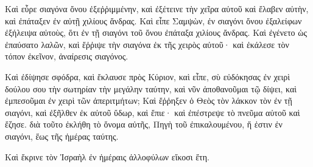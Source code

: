{Καὶ εὗρε σιαγόνα ὄνου ἐξεῤῥιμμένην, καὶ ἐξέτεινε τὴν χεῖρα αὐτοῦ καὶ ἔλαβεν αὐτὴν, καὶ ἐπάταξεν ἐν αὐτῇ χιλίους ἄνδρας.
Καὶ εἶπε Σαμψὼν, ἐν σιαγόνι ὄνου ἐξαλείφων ἐξήλειψα αὐτοὺς, ὅτι ἐν τῇ σιαγόνι τοῦ ὄνου ἐπάταξα χιλίους ἄνδρας.
Καὶ ἐγένετο ὡς ἐπαύσατο λαλῶν, καὶ ἔῤῥιψε τὴν σιαγόνα ἐκ τῆς χειρὸς αὐτοῦ· καὶ ἐκάλεσε τὸν τόπον ἐκεῖνον, ἀναίρεσις σιαγόνος.
\par }{\PP {}Καὶ ἐδίψησε σφόδρα, καὶ ἔκλαυσε πρὸς Κύριον, καὶ εἶπε, σὺ εὐδόκησας ἐν χειρὶ δούλου σου τὴν σωτηρίαν τὴν μεγάλην ταύτην, καὶ νῦν ἀποθανοῦμαι τῷ δίψει, καὶ ἐμπεσοῦμαι ἐν χειρὶ τῶν ἀπεριτμήτων;
Καὶ ἔῤῥηξεν ὁ Θεὸς τὸν λάκκον τὸν ἐν τῇ σιαγόνι, καὶ ἐξῆλθεν ἐκ αὐτοῦ ὕδωρ, καὶ ἔπιε· καὶ ἐπέστρεψε τὸ πνεῦμα αὐτοῦ καὶ ἔζησε. διὰ τοῦτο ἐκλήθη τὸ ὄνομα αὐτῆς, Πηγὴ τοῦ ἐπικαλουμένου, ἥ ἐστιν ἐν σιαγόνι, ἕως τῆς ἡμέρας ταύτης.
\par }{\PP {}Καὶ ἔκρινε τὸν Ἰσραὴλ ἐν ἡμέραις ἀλλοφύλων εἴκοσι ἔτη.

}
